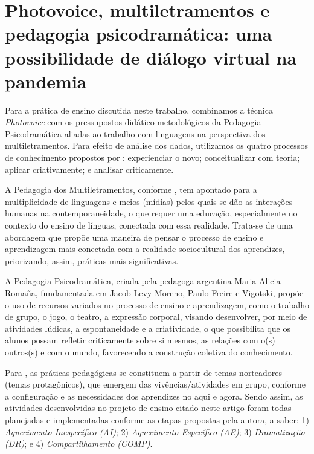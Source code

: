 \section{Photovoice, multiletramentos e pedagogia psicodramática: uma possibilidade 
	de diálogo virtual na pandemia}\label{sec-Photovoice,multiletramentos}
	
Para a prática de ensino discutida neste trabalho, combinamos a técnica \textit{Photovoice} \cite{wang_photovoice:_1997} com os pressupostos didático-metodológicos da Pedagogia Psicodramática \cite{romana_pedagogia_2019} aliadas ao trabalho com linguagens na perspectiva dos multiletramentos. Para efeito de análise dos dados, utilizamos os quatro processos de conhecimento propostos por \textcite{cope_letramentos_2020}: experienciar o novo; conceitualizar com teoria; aplicar criativamente; e analisar criticamente.

A Pedagogia dos Multiletramentos, conforme \textcite{cope_letramentos_2020}, tem apontado para a multiplicidade de linguagens e meios (mídias) pelos quais se dão as interações humanas na contemporaneidade, o que requer uma educação, especialmente no contexto do ensino de línguas, conectada com essa realidade. Trata-se de uma abordagem que propõe uma maneira de pensar o processo de ensino e aprendizagem mais conectada com a realidade sociocultural dos aprendizes, priorizando, assim, práticas mais significativas.

A Pedagogia Psicodramática, criada pela pedagoga argentina Maria Alicia Romaña, fundamentada em Jacob Levy Moreno, Paulo Freire e Vigotski, propõe o uso de recursos variados no processo de ensino e aprendizagem, como o trabalho de grupo, o jogo, o teatro, a expressão corporal, visando desenvolver, por meio de atividades lúdicas, a espontaneidade e a criatividade, o que possibilita que os alunos possam refletir criticamente sobre si mesmos, as relações com o(s) outros(s) e com o mundo, favorecendo a construção coletiva do conhecimento.

Para \textcite{romana_pedagogia_2019}, as práticas pedagógicas se constituem a partir de temas norteadores (temas protagônicos), que emergem das vivências/atividades em grupo, conforme a configuração e as necessidades dos aprendizes no aqui e agora. Sendo assim, as atividades desenvolvidas no projeto de ensino citado neste artigo foram todas planejadas e implementadas conforme as etapas propostas pela autora, a saber: 1) \textit{Aquecimento Inespecífico (AI)}; 2)\textit{ Aquecimento Específico (AE)}; 3) \textit{Dramatização (DR)}; e 4) \textit{Compartilhamento (COMP)}.

